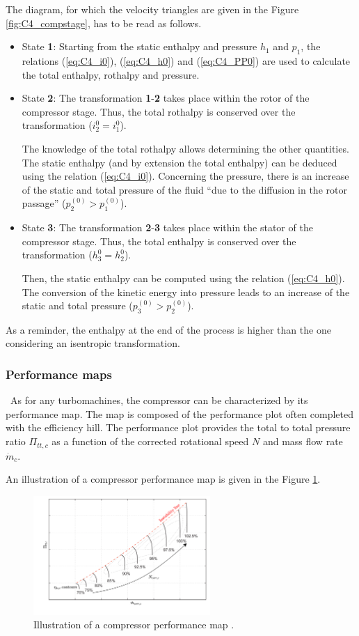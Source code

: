 The diagram, for which the velocity triangles are given in the Figure \ref{fig:C4_compstage}, has to be read as follows.
\begin{itemize}
    \item State \textbf{1}: Starting from the static enthalpy and pressure \(h_1\) and \(p_1\), the relations (\ref{eq:C4_i0}), (\ref{eq:C4_h0}) and (\ref{eq:C4_PP0}) are used to calculate the total enthalpy, rothalpy and pressure.
    \item State \textbf{2}: The transformation \textbf{1}-\textbf{2} takes place within the rotor of the compressor stage. Thus, the total rothalpy is conserved over the transformation ($i_2^0=i_1^0$).

    The knowledge of the total rothalpy allows determining the other quantities. The static enthalpy (and by extension the total enthalpy) can be deduced using the relation (\ref{eq:C4_i0}). Concerning the pressure, there is an increase of the static and total pressure of the fluid “due to the diffusion in the rotor passage” \cite{Hillewaert2019} ($p_2^{(0)} > p_1^{(0)}$).

    \item State \textbf{3}: The transformation \textbf{2}-\textbf{3} takes place within the stator of the compressor stage. Thus, the total enthalpy is conserved over the transformation ($h_3^0 = h_2^0$).

    Then, the static enthalpy can be computed using the relation (\ref{eq:C4_h0}). The conversion of the kinetic energy into pressure leads to an increase of the static and total pressure ($p_3^{(0)} > p_2^{(0)}$).
\end{itemize}
As a reminder, the enthalpy at the end of the process is higher than the one considering an isentropic transformation.
\subsubsection{Performance maps}
\quad\ As for any turbomachines, the compressor can be characterized by its performance map. The map is composed of the performance plot often completed with the efficiency hill. The performance plot provides the total to total pressure ratio \(\Pi_{tt,c}\) as a function of the corrected rotational speed \(N\) and mass flow rate \(\dot{m}_c\).

An illustration of a compressor performance map is given in the Figure \ref{fig:C4_compmap}.
\begin{figure}[h]
    \centering
    \includegraphics[width=0.6\textwidth]{Comp_Map.png}
    \caption{Illustration of a compressor performance map \cite{Dixon2013}.}
    \label{fig:C4_compmap}
\end{figure}

